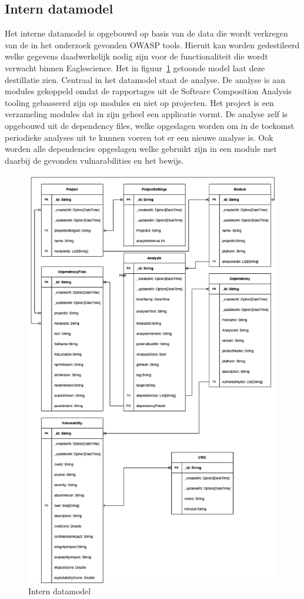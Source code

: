 \subsection{Intern datamodel}\label{subsec:interne-datamodel}
Het interne datamodel is opgebouwd op basis van de data die wordt verkregen van de in het onderzoek gevonden OWASP tools. Hieruit kan worden gedestileerd welke gegevens daadwerkelijk nodig zijn voor de functionaliteit die wordt verwacht binnen Eaglescience. Het in figuur~\ref{fig:SOUP-SoupApiDm} getoonde model laat deze destillatie zien. Centraal in het datamodel staat de analyse. De analyse is aan modules gekoppeld omdat de rapportages uit de Softeare Composition Analysis tooling gebasseerd zijn op modules en niet op projecten. Het project is een verzameling modules dat in zijn geheel een applicatie vormt. De analyse zelf is opgebouwd uit de dependency files, welke opgeslagen worden om in de toekomst periodieke analyses uit te kunnen voeren tot er een nieuwe analyse is. Ook worden alle dependencies opgeslagen welke gebruikt zijn in een module met daarbij de gevonden vulnarabilities en het bewijs.

\begin{figure}[H]
    \myfloatalign
    \includegraphics[width=15cm]{gfx/SOUPAPI-SOUPAPI DM}
    \caption{Intern datamodel}
    \label{fig:SOUP-SoupApiDm}
\end{figure}

